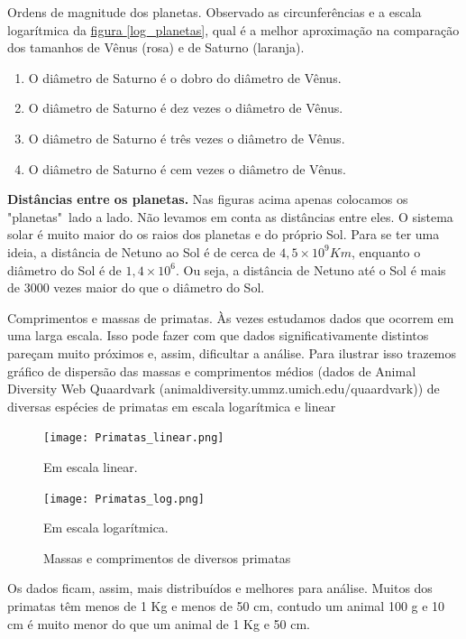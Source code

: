 \begin{task}{Ordens de magnitude dos planetas.}
Observado as circunferências e a escala logarítmica da \hyperref[log_planetas]{figura \ref{log_planetas}}, qual é a melhor aproximação na comparação dos tamanhos de Vênus (rosa) e de Saturno (laranja).
\begin{enumerate}
\item O diâmetro de Saturno é o dobro do diâmetro de Vênus.
\item O diâmetro de Saturno é dez vezes o diâmetro de Vênus.
\item O diâmetro de Saturno é três vezes o diâmetro de Vênus.
\item O diâmetro de Saturno é cem vezes o diâmetro de Vênus.
\end{enumerate}
\end{task}


\begin{knowledge}
\textbf{Distâncias entre os planetas.}
Nas figuras acima apenas colocamos os "planetas"\, lado a lado. Não levamos em conta as distâncias entre eles. O sistema solar é muito maior do os raios  dos planetas e do próprio Sol. Para se ter uma ideia, a distância de Netuno ao Sol é de cerca de $4{,}5 \times 10^{9}Km$, enquanto o diâmetro do Sol é de $1{,}4 \times 10^6$. Ou seja, a distância de Netuno até o Sol é mais de 3000 vezes maior do que o diâmetro do Sol.
\end{knowledge}

\begin{example}{Comprimentos e massas de primatas.}
Às vezes estudamos dados que ocorrem em uma larga escala. Isso pode fazer com que dados significativamente distintos pareçam muito próximos e, assim, dificultar a análise. Para ilustrar isso trazemos gráfico de dispersão das massas e comprimentos médios (dados de Animal Diversity Web Quaardvark (animaldiversity.ummz.umich.edu/quaardvark)) de diversas espécies de primatas em escala logarítmica e linear

\begin{figure}[H]
\centering
\begin{multicols}{2}
\null\vfill
\texttt{[image: Primatas\_linear.png]}

Em escala linear.
\vfill\null
\columnbreak

\null\vfill
\texttt{[image: Primatas\_log.png]}

Em escala logarítmica.
\vfill\null
\end{multicols}
\caption{Massas e comprimentos de diversos primatas}
\end{figure}

Os dados ficam, assim, mais distribuídos e melhores para análise. Muitos dos primatas têm menos de 1 Kg e menos de 50 cm, contudo um animal  100 g e 10 cm é muito menor do que um animal de 1 Kg e 50 cm.
\end{example}

